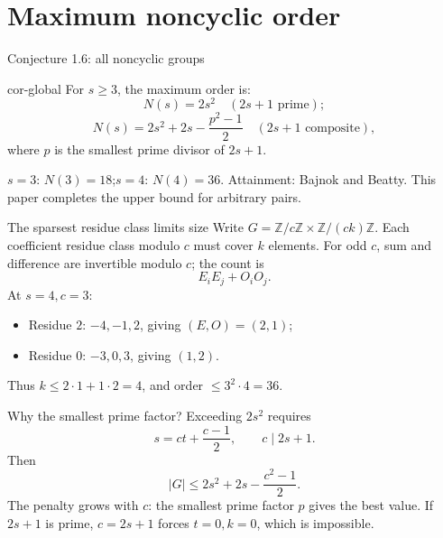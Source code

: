 \documentclass{beamer}
\begin{document}
\section{Maximum noncyclic order}
\begin{frame}{Conjecture 1.6: all noncyclic groups}
\begin{bookresult}{cor-global}
For $s\ge3$, the maximum order is:
\[N(s)=2s^2\quad (2s+1\text{ prime});\]
\[N(s)=2s^2+2s-\frac{p^2-1}{2}\quad (2s+1\text{ composite}),\]
where $p$ is the smallest prime divisor of $2s+1$.
\end{bookresult}
$s=3$: $N(3)=18$;\quad $s=4$: $N(4)=36$.
\medskip
Attainment: Bajnok and Beatty. This paper completes the upper bound for arbitrary pairs.
\end{frame}
\begin{frame}{The sparsest residue class limits size}
Write $G=\mathbb Z/c\mathbb Z\times\mathbb Z/(ck)\mathbb Z$.
Each coefficient residue class modulo $c$ must cover $k$ elements.
\medskip
For odd $c$, sum and difference are invertible modulo $c$; the count is
\[E_iE_j+O_iO_j.\]
At $s=4,c=3$:
\begin{itemize}
\item Residue $2$: $-4,-1,2$, giving $(E,O)=(2,1)$;
\item Residue $0$: $-3,0,3$, giving $(1,2)$.
\end{itemize}
Thus $k\le2\cdot1+1\cdot2=4$, and order $\le3^2\cdot4=36$.
\end{frame}
\begin{frame}{Why the smallest prime factor?}
Exceeding $2s^2$ requires
\[s=ct+\frac{c-1}{2},\qquad c\mid2s+1.\]
Then
\[|G|\le2s^2+2s-\frac{c^2-1}{2}.\]
The penalty grows with $c$: the smallest prime factor $p$ gives the best value.
\medskip
If $2s+1$ is prime, $c=2s+1$ forces $t=0,k=0$, which is impossible.
\end{frame}
\end{document}
